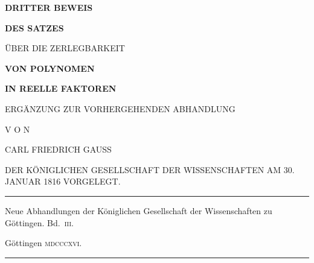 \clearpage
{}
\thispagestyle{empty}
\begin{center}
\vspace*{.25in}
{\large\bfseries DRITTER BEWEIS}\par
\vspace{.35in}
{\Large\bfseries DES SATZES\par
\medskip ÜBER DIE ZERLEGBARKEIT}\par
\vspace{.35in}
{\bfseries VON POLYNOMEN}\par
\vspace{.35in}
{\large\bfseries IN REELLE FAKTOREN}\par
\vspace{.5in}
ERGÄNZUNG ZUR VORHERGEHENDEN ABHANDLUNG\par
\vspace{.5in}
V O N\par
\vspace{.3in}
{\large CARL FRIEDRICH GAUSS}\par
\vspace{.4in}
DER KÖNIGLICHEN GESELLSCHAFT DER WISSENSCHAFTEN AM 30. JANUAR 1816 VORGELEGT.\par
\vspace{.65in}
\rule{.88\linewidth}{.3pt}\par
\medskip
{\small Neue Abhandlungen der Königlichen Gesellschaft der Wissenschaften zu Göttingen. Bd.~\textsc{iii}.\par}
\medskip
Göttingen \textsc{mdcccxvi}.\par
\medskip
\rule{.88\linewidth}{.3pt}
\end{center}
\clearpage
